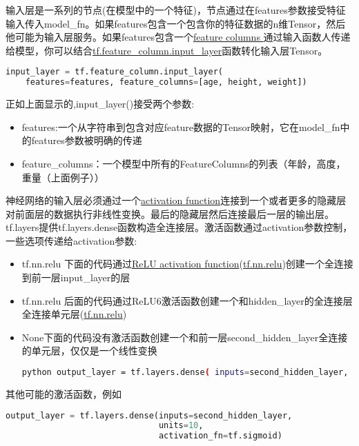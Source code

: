 输入层是一系列的节点(在模型中的一个特征)，节点通过在features参数接受特征输入传入model\_fn。如果features包含一个包含你的特征数据的n维Tensor，然后他可能为输入层服务。如果features包含一个\href{https://www.tensorflow.org/tutorials/linear#feature_columns_and_transformations}{feature columns }通过输入函数人传递给模型，你可以结合\href{https://www.tensorflow.org/api_docs/python/tf/feature_column/input_layer}{tf.feature\_column.input\_layer}函数转化输入层Tensor。
\begin{lstlisting}[language=Python]
input_layer = tf.feature_column.input_layer(
    features=features, feature_columns=[age, height, weight])
\end{lstlisting}
正如上面显示的,input\_layer()接受两个参数:
\begin{itemize}
		\item features:一个从字符串到包含对应feature数据的Tensor映射，它在model\_fn中的features参数被明确的传递
		\item feature\_columns：一个模型中所有的FeatureColumns的列表（年龄，高度，重量（上面例子））
\end{itemize}
神经网络的输入层必须通过一个\href{https://en.wikipedia.org/wiki/Activation_function}{activation function}连接到一个或者更多的隐藏层对前面层的数据执行非线性变换。最后的隐藏层然后连接最后一层的输出层。tf.layers提供tf.layers.dense函数构造全连接层。激活函数通过activation参数控制，一些选项传递给activation参数:
\begin{itemize}
	\item tf.nn.relu 下面的代码通过\href{https://en.wikipedia.org/wiki/Rectifier_(neural_networks)}{ReLU activation function}(\href{https://www.tensorflow.org/api_docs/python/tf/nn/relu}{tf.nn.relu})创建一个全连接到前一层input\_layer的层
	\item tf.nn.relu 后面的代码通过ReLU6激活函数创建一个和hidden\_layer的全连接层全连接单元层(\href{https://www.tensorflow.org/api_docs/python/tf/nn/relu6}{tf.nn.relu})
	\item None下面的代码没有激活函数创建一个和前一层second\_hidden\_layer全连接的单元层，仅仅是一个线性变换
		\begin{lstlisting}[language=Bash]
		python output_layer = tf.layers.dense( inputs=second_hidden_layer, units=3, activation=None)
		\end{lstlisting}
\end{itemize}
其他可能的激活函数，例如
\begin{lstlisting}[language=Python]
output_layer = tf.layers.dense(inputs=second_hidden_layer,
                               units=10,
                               activation_fn=tf.sigmoid)
\end{lstlisting}
